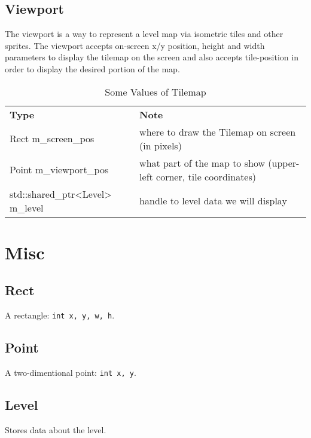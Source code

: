 \documentclass[a4paper,10pt]{book}
\begin{document}
\section{\enginenamespace{}Viewport}
The viewport is a way to represent a level map via isometric tiles and other sprites.
The viewport accepts on-screen x/y position, height and width parameters to
display the tilemap on the screen and also accepts tile-position in order to
display the desired portion of the map.
\begin{table}[h]
  \caption{Some Values of \enginenamespace{}Tilemap}
  \begin{tabular}{p{} p{}}
    \textbf{Type} & \textbf{Note} \\
    \enginenamespace{}Rect m\_screen\_pos & where to draw the Tilemap on screen (in pixels) \\
    \enginenamespace{}Point m\_viewport\_pos & what part of the map to show (upper-left corner,
                                               tile coordinates) \\
    std::shared\_ptr<\enginenamespace{}Level> m\_level & handle to level data we will display \\
  \end{tabular}
\end{table}
\chapter{Misc}
\section{\enginenamespace{}Rect}
A rectangle: \texttt{int x, y, w, h}.
\section{\enginenamespace{}Point}
A two-dimentional point: \texttt{int x, y}.
\section{\enginenamespace{}Level}
Stores data about the level.
\end{document}

